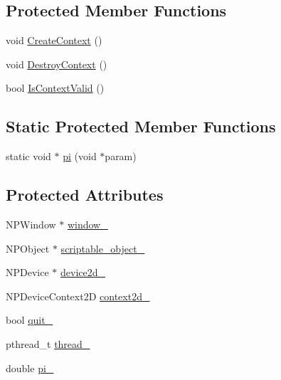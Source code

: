 \subsection*{Protected Member Functions}
\begin{DoxyCompactItemize}
\item 
void \hyperlink{classbridge_1_1_pi_generator_aa5be4efa2d7fe286582ccec734619db4}{CreateContext} ()
\item 
void \hyperlink{classbridge_1_1_pi_generator_ad0299e34e6e407bdb4b10dd6b26772e1}{DestroyContext} ()
\item 
bool \hyperlink{classbridge_1_1_pi_generator_a500184b53b32eebd3cdd13f71cb811f5}{IsContextValid} ()
\end{DoxyCompactItemize}
\subsection*{Static Protected Member Functions}
\begin{DoxyCompactItemize}
\item 
static void $\ast$ \hyperlink{classbridge_1_1_pi_generator_a869dcf4a6fb5598feece0d4d184caf23}{pi} (void $\ast$param)
\end{DoxyCompactItemize}
\subsection*{Protected Attributes}
\begin{DoxyCompactItemize}
\item 
NPWindow $\ast$ \hyperlink{classbridge_1_1_pi_generator_afd258b7e7f03a3b4f09e3f79138ffde2}{window\_\-}
\item 
NPObject $\ast$ \hyperlink{classbridge_1_1_pi_generator_ae14b036a67c19bcd76c7974e3c0314e2}{scriptable\_\-object\_\-}
\item 
NPDevice $\ast$ \hyperlink{classbridge_1_1_pi_generator_a931cd35dcd337f8c8d31e401e714b67b}{device2d\_\-}
\item 
NPDeviceContext2D \hyperlink{classbridge_1_1_pi_generator_a8c9e304f8243c23dae9e10186c550572}{context2d\_\-}
\item 
bool \hyperlink{classbridge_1_1_pi_generator_a682f8e27a788cb81f1b862b02e6ab127}{quit\_\-}
\item 
pthread\_\-t \hyperlink{classbridge_1_1_pi_generator_ac31876104c79e459dd2d8fbe18a9932a}{thread\_\-}
\item 
double \hyperlink{classbridge_1_1_pi_generator_a3d35a8b7e364db2572a1e3e983ff5053}{pi\_\-}
\end{DoxyCompactItemize}


